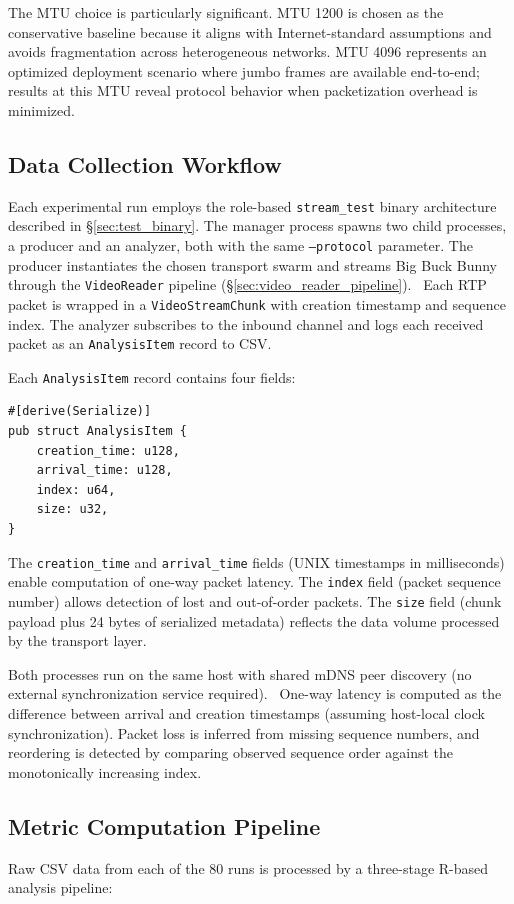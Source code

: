 The \ac{MTU} choice is particularly significant. \ac{MTU} 1200 is chosen as the conservative baseline because it aligns with Internet-standard assumptions and avoids fragmentation across heterogeneous networks. \ac{MTU} 4096 represents an optimized deployment scenario where jumbo frames are available end-to-end; results at this \ac{MTU} reveal protocol behavior when packetization overhead is minimized.

\subsection{Data Collection Workflow}
Each experimental run employs the role-based \texttt{stream\_test} binary architecture described in \S\ref{sec:test_binary}.
The manager process spawns two child processes, a producer and an analyzer, both with the same \texttt{--protocol} parameter.
The producer instantiates the chosen transport swarm and streams Big Buck Bunny through the \texttt{VideoReader} pipeline (\S\ref{sec:video_reader_pipeline}).~\cite{BigBuckBunny}
Each \ac{RTP} packet is wrapped in a \texttt{VideoStreamChunk} with creation timestamp and sequence index.
The analyzer subscribes to the inbound channel and logs each received packet as an \texttt{AnalysisItem} record to CSV.

Each \texttt{AnalysisItem} record contains four fields:
\begin{Verbatim}[samepage=true]
#[derive(Serialize)]
pub struct AnalysisItem {
    creation_time: u128,
    arrival_time: u128,
    index: u64,
    size: u32,
}
\end{Verbatim}
The \texttt{creation\_time} and \texttt{arrival\_time} fields (UNIX timestamps in milliseconds) enable computation of one-way packet latency. The \texttt{index} field (packet sequence number) allows detection of lost and out-of-order packets. The \texttt{size} field (chunk payload plus 24 bytes of serialized metadata) reflects the data volume processed by the transport layer.

Both processes run on the same host with shared mDNS peer discovery (no external synchronization service required).~\cite{cheshireMulticastDNS2013} One-way latency is computed as the difference between arrival and creation timestamps (assuming host-local clock synchronization). Packet loss is inferred from missing sequence numbers, and reordering is detected by comparing observed sequence order against the monotonically increasing index.

\subsection{Metric Computation Pipeline}
Raw CSV data from each of the 80 runs is processed by a three-stage R-based analysis pipeline:

